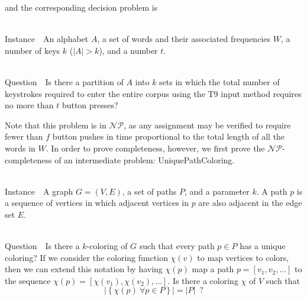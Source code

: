 \documentclass[runningheads]{llncs}
\newcommand{\NP}{\ensuremath{\mathcal{NP}}}
\newcommand{\Instance}{{\sc Instance~}}
\newcommand{\Question}{~\\
{\sc Question~}}
\begin{document}
and the corresponding decision problem is

\begin{prob}~\\
\Instance\ An alphabet $A$, a set of words and their associated frequencies $W$, a number of keys $k$ ($|A| > k$), and a number $t$.

\Question\ Is there a partition of $A$ into $k$ sets in which the total number of keystrokes required to enter the entire corpus using the T9 input method requires no more than $t$ button presses?
\end{prob}

Note that this problem is in \NP, as any assignment may be verified to require
fewer than $f$ button pushes in time proportional to the
total length of all the words in $W$.  In order to prove completeness, however,
we first prove the \NP-completeness of an intermediate problem: {\sc
UniquePathColoring}.

\begin{prob}[{\sc UniquePathColoring}]~\\
\label{upcolor}
\Instance\ A graph $G=(V,E)$, a set of paths $P$, and a parameter $k$.  A path $p$ is a sequence of vertices in which adjacent vertices in $p$ are also adjacent in the edge set $E$.

\Question\ Is there a $k$-coloring of $G$ such that every path $p\in P$ has a unique coloring?  If we consider the coloring function $\chi(v)$ to map vertices to colors, then we can extend this notation by having $\chi(p)$ map a path $p = [ v_1, v_2, \ldots ]$ to the sequence $\chi(p) = [ \chi(v_1), \chi(v_2), \ldots ]$.  Is there a coloring $\chi$ of $V$ such that 
    $$|\left\{ \chi(p)~\forall p \in P\right\}| = |P|\enspace ?$$
\end{prob}
\end{document}
